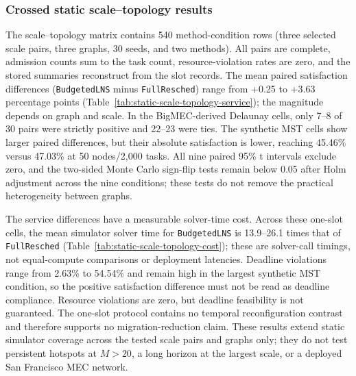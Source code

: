 \documentclass[preprint,12pt]{elsarticle}
\begin{document}
\subsubsection{Crossed static scale--topology results}

The scale--topology matrix contains 540 method-condition rows (three selected
scale pairs, three graphs, 30 seeds, and two methods). All pairs are complete,
admission counts sum to the task count, resource-violation rates are zero, and
the stored summaries reconstruct from the slot records. The mean paired
satisfaction differences (\texttt{BudgetedLNS} minus \texttt{FullResched})
range from +0.25 to +3.63 percentage points (Table~\ref{tab:static-scale-topology-service});
the magnitude depends on graph and scale. In the BigMEC-derived Delaunay cells,
only 7--8 of 30 pairs were strictly positive and 22--23 were ties. The
synthetic MST cells show larger paired differences, but their absolute
satisfaction is lower, reaching 45.46\% versus 47.03\% at 50 nodes/2,000
tasks. All nine paired 95\% t intervals exclude zero, and the two-sided
Monte Carlo sign-flip tests remain below 0.05 after Holm adjustment across
the nine conditions; these tests do not remove the practical heterogeneity
between graphs.

The service differences have a measurable solver-time cost. Across these
one-slot cells, the mean simulator solver time for \texttt{BudgetedLNS} is
13.9--26.1 times that of \texttt{FullResched} (Table~\ref{tab:static-scale-topology-cost});
these are solver-call timings, not equal-compute comparisons or deployment
latencies. Deadline violations range from 2.63\% to 54.54\% and remain high
in the largest synthetic MST condition, so the positive satisfaction
difference must not be read as deadline compliance. Resource violations are
zero, but deadline feasibility is not guaranteed. The one-slot protocol
contains no temporal reconfiguration contrast and therefore supports no
migration-reduction claim. These results extend static simulator coverage
across the tested scale pairs and graphs only; they do not test persistent
hotspots at $M>20$, a long horizon at the largest scale, or a deployed San
Francisco MEC network.
\end{document}
